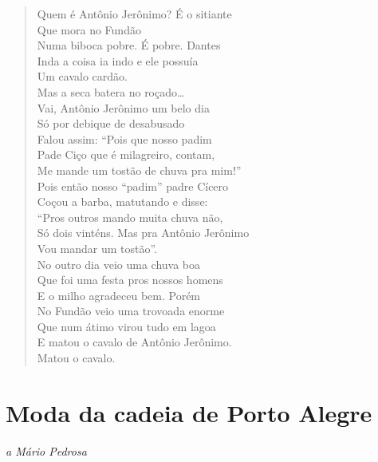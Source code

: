 \begin{verse}
Quem é Antônio Jerônimo? É o sitiante\\
\qquad\quad{}Que mora no Fundão\\
Numa biboca pobre. É pobre. Dantes\\
Inda a coisa ia indo e ele possuía\\
\qquad\quad{}Um cavalo cardão.\\
Mas a seca batera no roçado\ldots{}\\
Vai, Antônio Jerônimo um belo dia\\
Só por debique de desabusado\\
Falou assim: ``Pois que nosso padim\\
Pade Ciço que é milagreiro, contam,\\
Me mande um tostão de chuva pra mim!''\\
Pois então nosso ``padim'' padre Cícero\\
Coçou a barba, matutando e disse:\\
``Pros outros mando muita chuva não,\\
Só dois vinténs. Mas pra Antônio Jerônimo\\
\qquad\quad{}Vou mandar um tostão''.\\
No outro dia veio uma chuva boa\\
Que foi uma festa pros nossos homens\\
E o milho agradeceu bem. Porém\\
No Fundão veio uma trovoada enorme\\
Que num átimo virou tudo em lagoa\\
E matou o cavalo de Antônio Jerônimo.\\
\qquad\quad{}Matou o cavalo.
\end{verse}

\pagebreak
{}
\section*{Moda da cadeia de Porto Alegre}

\begin{flushright}
\emph{a Mário Pedrosa}
\end{flushright}

